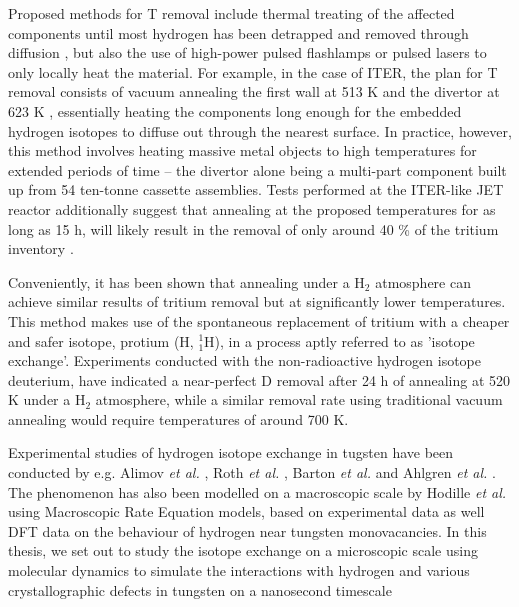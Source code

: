 Proposed methods for T removal include thermal treating of the affected components until most hydrogen has been detrapped and removed through diffusion \cite{heinola2017long}, but also the use of high-power pulsed flashlamps \cite{gibson2005removal} or pulsed lasers \cite{skinner2008recent,de2017efficiency} to only locally heat the material. 
For example, in the case of ITER, the plan for T removal consists of vacuum annealing the first wall at 513 K and the divertor at 623 K \cite{pitts2011physics}, essentially heating the components long enough for the embedded hydrogen isotopes to diffuse out through the nearest surface.
In practice, however, this method involves heating massive metal objects to high temperatures for extended periods of time -- the divertor alone being a multi-part component built up from 54 ten-tonne cassette assemblies. 
Tests performed at the ITER-like JET reactor additionally suggest that annealing at the proposed temperatures for as long as 15 h, will likely result in the removal of only around 40 \% of the tritium inventory \cite{heinola2017long}. 

Conveniently, it has been shown \cite{alimov2011hydrogen, roth2013hydrogen, barton2014deuterium} that annealing under a H$_2$ atmosphere can achieve similar results of tritium removal but at significantly lower temperatures. 
This method makes use of the spontaneous replacement of tritium with a cheaper and safer isotope, protium (H, $^1_1$H), in a process aptly referred to as 'isotope exchange'. 
Experiments conducted with the non-radioactive hydrogen isotope deuterium, have indicated a near-perfect D removal after 24 h of annealing at 520 K under a H$_2$ atmosphere, while a similar removal rate using traditional vacuum annealing would require temperatures of around 700 K. \cite{ahlgren2019hydrogen}

Experimental studies of hydrogen isotope exchange in tugsten have been conducted by e.g. Alimov \textit{et al.} \cite{alimov2011hydrogen}, Roth \textit{et al.}  \cite{roth2013hydrogen}, Barton \textit{et al.} \cite{barton2014deuterium} and Ahlgren \textit{et al.} \cite{ahlgren2019hydrogen}. 
The phenomenon has also been modelled on a macroscopic scale by Hodille \textit{et al.} \cite{hodille2016study} using Macroscopic Rate Equation models, based on experimental data as well DFT data on the behaviour of hydrogen near tungsten monovacancies. 
In this thesis, we set out to study the isotope exchange on a microscopic scale using molecular dynamics to simulate the interactions with hydrogen and various crystallographic defects in tungsten on a nanosecond timescale
